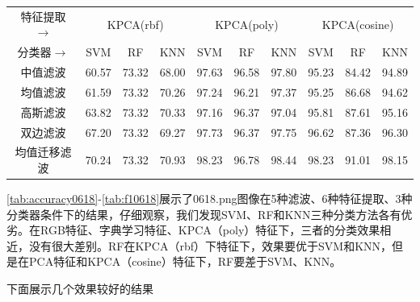 \documentclass[12pt,hyperref,a4paper,UTF8]{ctexart}
\begin{document}
{\begin{table}[!h]
\begin{tabular}{@{}clllllllll@{}}
		\hline
		特征提取$\rightarrow$    & \multicolumn{3}{c}{KPCA(rbf)}                                              & \multicolumn{3}{c}{KPCA(poly)}                                             & \multicolumn{3}{c}{KPCA(cosine)}                                           \\
		分类器$\rightarrow$     & \multicolumn{1}{c}{SVM} & \multicolumn{1}{c}{RF} & \multicolumn{1}{c}{KNN} & \multicolumn{1}{c}{SVM} & \multicolumn{1}{c}{RF} & \multicolumn{1}{c}{KNN} & \multicolumn{1}{c}{SVM} & \multicolumn{1}{c}{RF} & \multicolumn{1}{c}{KNN} \\
		\hline
		中值滤波                 & 60.57                   & 73.32                  & 68.00                   & 97.63                   & 96.58                  & 97.80                   & 95.23                   & 84.42                  & 94.89                   \\
		均值滤波                 & 61.59                   & 73.32                  & 70.26                   & 97.24                   & 96.21                  & 97.37                   & 95.25                   & 86.68                  & 94.62                   \\
		高斯滤波                 & 63.82                   & 73.32                  & 70.33                   & 97.16                   & 96.37                  & 97.04                   & 95.81                   & 87.61                  & 95.16                   \\
		双边滤波                 & 67.20                   & 73.32                  & 69.27                   & 97.73                   & 96.37                  & 97.75                   & 96.62                   & 87.36                  & 96.30                   \\
		均值迁移滤波               & 70.24                   & 73.32                  & 70.93                   & 98.23                   & 96.78                  & 98.44                   & 98.23                   & 91.01                  & 98.15                  \\
		\hline
	\end{tabular}
\end{table}

\autoref{tab:accuracy0618}-\ref{tab:f10618}展示了0618.png图像在5种滤波、6种特征提取、3种分类器条件下的结果，仔细观察，我们发现SVM、RF和KNN三种分类方法各有优劣。在RGB特征、字典学习特征、KPCA（poly）特征下，三者的分类效果相近，没有很大差别。RF在KPCA（rbf）下特征下，效果要优于SVM和KNN，但是在PCA特征和KPCA（cosine）特征下，RF要差于SVM、KNN。
\par
下面展示几个效果较好的结果


}
\end{document}
